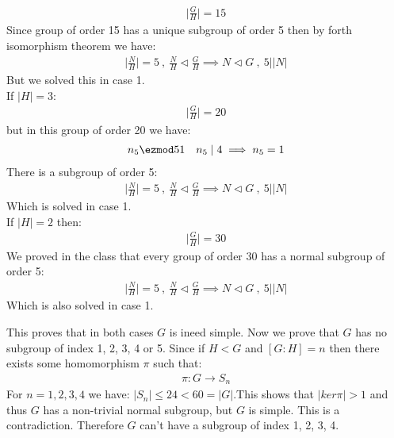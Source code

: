 \begin{enumerate}[label=\ilabel]
\begin{enumerate}[label=Case \arabic*)]
\begin{gather*}
                    \bigg|\frac{G}{H}\bigg| = 15
                \end{gather*}
                Since group of order 15 has a unique subgroup of order 5 then by forth isomorphism theorem we have:
                \begin{gather*}
                    \bigg|\frac{N}{H}\bigg| = 5 \ , \  \frac{N}{H} \lhd \frac{G}{H}  \implies N \lhd G \ , \ 5 \big| |N|
                \end{gather*}
                But we solved this in case 1. \\
                If $|H| = 3$:
                \begin{gather*}
                    \bigg|\frac{G}{H}\bigg| = 20
                \end{gather*}
                but in this group of order 20 we have:
                \begin{gather*}
                    n_5 \ezmod 5 1 \ \ \ n_5 \mid 4 \implies n_5 = 1
                \end{gather*}
                There is a subgroup of order 5:
                \begin{gather*}
                    \bigg|\frac{N}{H}\bigg| = 5 \ , \  \frac{N}{H} \lhd \frac{G}{H}  \implies N \lhd G \ , \ 5 \big| |N|
                \end{gather*}
                Which is solved in case 1. \\
                If $|H| = 2$ then:
                \begin{gather*}
                    \bigg|\frac{G}{H}\bigg| = 30
                \end{gather*}
                We proved in the class that every group of order 30 has a normal subgroup of order 5:
                \begin{gather*}
                    \bigg|\frac{N}{H}\bigg| = 5 \ , \  \frac{N}{H} \lhd \frac{G}{H}  \implies N \lhd G \ , \ 5 \big| |N|
                \end{gather*}
                Which is also solved in case 1.
        \end{enumerate}
        This proves that in both cases $G$ is ineed simple. Now we prove that $G$ has no subgroup of index 1, 2, 3, 4 or 5. Since if $H < G$ and $[G: H] = n$ then there exists some homomorphism $\pi$ such that:
        \begin{gather*}
            \pi: G \to S_n
        \end{gather*}
        For $n = 1, 2, 3, 4$ we have: $|S_n| \le 24 < 60 = |G|$.This shows that $|ker \pi| > 1$ and thus $G$ has a non-trivial normal subgroup, but $G$ is simple. This is a contradiction. Therefore $G$ can't have a subgroup of index 1, 2, 3, 4.

\end{enumerate}
